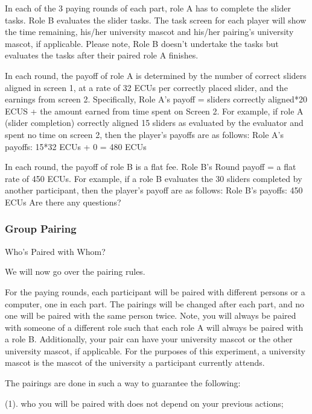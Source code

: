 In each of the 3 paying rounds of each part, role A has to complete the slider tasks. Role B evaluates the slider tasks. The task screen for each player will show the time remaining, his/her university mascot and his/her pairing’s university mascot, if applicable. Please note, Role B doesn’t undertake the tasks but evaluates the tasks after their paired role A finishes.

In each round, the payoff of role A is determined by the number of correct sliders aligned in screen 1, at a rate of 32 ECUs per correctly placed slider, and the earnings from screen 2. Specifically, Role A’s payoff = sliders correctly aligned*20 ECUS + the amount earned from time spent on Screen 2. For example, if role A (slider completion) correctly aligned 15 sliders as evaluated by the evaluator and spent no time on screen 2, then the player’s payoffs are as follows:
Role A’s payoffs: 15*32 ECUs + 0 = 480 ECUs


In each round, the payoff of role B is a flat fee. Role B’s Round payoff = a flat rate of 450 ECUs. For example, if a role B evaluates the 30 sliders completed by another participant, then the player’s payoff are as follows: 
Role B’s payoffs: 450 ECUs
Are there any questions?

\subsubsection{Group Pairing}
\newline
Who’s Paired with Whom?

We will now go over the pairing rules. 

For the paying rounds, each participant will be paired with different persons or a computer, one in each part.  The pairings will be changed after each part, and no one will be paired with the same person twice.  Note, you will always be paired with someone of a different role such that each role A will always be paired with a role B. Additionally, your pair can have your university mascot or the other university mascot, if applicable. For the purposes of this experiment, a university mascot is the mascot of the university a participant currently attends.  

\newline

The pairings are done in such a way to guarantee the following: 
\newline
 
  (1). who you will be paired with does not depend on your previous actions;
  \newline


